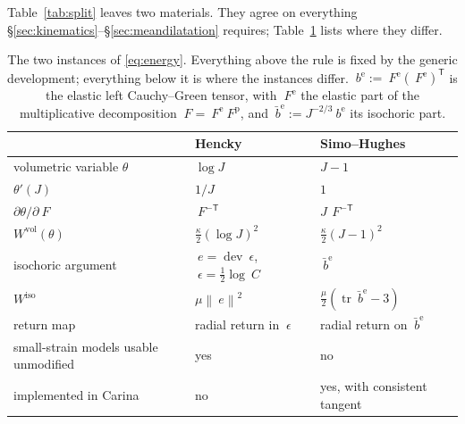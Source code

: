 \documentclass[11pt]{article}
\newcommand{\F}{~F}
\newcommand{\C}{~C}
\newcommand{\eps}{~\epsilon}
\newcommand{\edev}{~e}
\newcommand{\dev}{\operatorname{dev}}
\newcommand{\trace}{\operatorname{tr}}
\newcommand{\transpose}[1]{#1^{\mathsf{T}}}
\newcommand{\norm}[1]{\left\lVert #1 \right\rVert}
\newcommand{\supvol}{^{\mathrm{vol}}}
\newcommand{\supiso}{^{\mathrm{iso}}}
\theoremstyle{definition}
\theoremstyle{plain}
\begin{document}
Table~\ref{tab:split} leaves two materials. They agree on everything
\S\ref{sec:kinematics}--\S\ref{sec:meandilatation} requires;
Table~\ref{tab:instances} lists where they differ.

\begin{table}[tbp]
  \centering
  \caption{The two instances of \eqref{eq:energy}. Everything above the rule is
  fixed by the generic development; everything below it is where the instances
  differ. $~b^{\mathrm e} := \F^{\mathrm e}\transpose{(\F^{\mathrm e})}$
  is the elastic left Cauchy--Green tensor, with $\F^{\mathrm e}$ the elastic
  part of the multiplicative decomposition $\F = \F^{\mathrm e}\F^{\mathrm p}$, and
  $\bar{~b}^{\mathrm e} := J^{-2/3}~b^{\mathrm e}$ its isochoric part.}
  \label{tab:instances}
  \begin{tabular}{lll}
    \toprule
                                & Hencky                       & Simo--Hughes \\
    \midrule
    volumetric variable $\theta$          & $\log J$           & $J - 1$ \\
    $\theta'(J)$                          & $1/J$              & $1$ \\
    $\partial\theta/\partial\F$           & $\F^{-\mathsf T}$  & $J\,\F^{-\mathsf T}$ \\
    $W\supvol(\theta)$                    & $\tfrac{\kappa}{2}(\log J)^2$ & $\tfrac{\kappa}{2}(J-1)^2$ \\
    \midrule
    isochoric argument                    & $\edev = \dev\eps$, $\eps = \tfrac12\log\C$
                                                               & $\bar{~b}^{\mathrm e}$ \\
    $W\supiso$                            & $\mu\norm{\edev}^2$
                                                               & $\tfrac{\mu}{2}(\trace\bar{~b}^{\mathrm e} - 3)$ \\
    return map                            & radial return in $\eps$ & radial return on $\bar{~b}^{\mathrm e}$ \\
    small-strain models usable unmodified & yes                & no \\
    implemented in Carina                 & no                 & yes, with consistent tangent \\
    \bottomrule
  \end{tabular}
\end{table}
\end{document}
